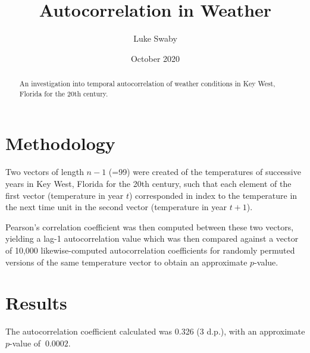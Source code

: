\documentclass[12pt]{article}
\title{Autocorrelation in Weather}
\author{Luke Swaby}
\date{October 2020}
\begin{document}
	\maketitle
  
	\begin{abstract}
	An investigation into temporal autocorrelation of weather conditions in Key West, Florida for the 20th century.
	\end{abstract}
  
	\section{Methodology}
	Two vectors of length $n-1$ (=99) were created of the temperatures of successive years in Key West, Florida for the 20th century, such that each element of the first vector (temperature in year $t$) corresponded in index to the temperature in the next time unit in the second vector (temperature in year $t+1$). 
	
	Pearson’s correlation coefficient was then computed between these two vectors, yielding a lag-1 autocorrelation value which was then compared against a vector of 10,000 likewise-computed autocorrelation coefficients for randomly permuted versions of the same temperature vector to obtain an approximate $p$-value.
	
	\section{Results}
	The autocorrelation coefficient calculated was 0.326 (3 d.p.), with an approximate $p$-value of $~0.0002$.
	
\end{document}
